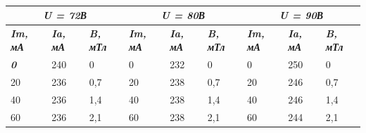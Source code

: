 \documentclass[a4paper,12pt]{article}
\begin{document}
\begin{table}[h]
\begin{center}
\caption{}
\begin{tabular}{|lll|lll|lll|}
\hline
\multicolumn{3}{|c|}{\cellcolor[HTML]{FFFFFF}\textit{\textbf{U   = 72В}}}                                                                         & \multicolumn{3}{c|}{\textit{\textbf{U = 80В}}}                                                                           & \multicolumn{3}{c|}{\textit{\textbf{U = 90В}}}                                                                           \\ \hline
\multicolumn{1}{|l|}{\cellcolor[HTML]{FFFFFF}\textit{\textbf{Im, мА}}} & \multicolumn{1}{l|}{\textit{\textbf{Ia, мА}}} & \textit{\textbf{B, мТл}} & \multicolumn{1}{l|}{\textit{\textbf{Im, мА}}} & \multicolumn{1}{l|}{\textit{\textbf{Ia, мА}}} & \textit{\textbf{B, мТл}} & \multicolumn{1}{l|}{\textit{\textbf{Im, мА}}} & \multicolumn{1}{l|}{\textit{\textbf{Ia, мА}}} & \textit{\textbf{B, мТл}} \\ \hline
\multicolumn{1}{|l|}{\cellcolor[HTML]{FFFFFF}\textit{\textbf{0}}}      & \multicolumn{1}{l|}{240}                      & 0                        & \multicolumn{1}{l|}{0}                        & \multicolumn{1}{l|}{232}                      & 0                        & \multicolumn{1}{l|}{0}                        & \multicolumn{1}{l|}{250}                      & 0                        \\ \hline
\multicolumn{1}{|l|}{20}                                               & \multicolumn{1}{l|}{236}                      & 0,7                      & \multicolumn{1}{l|}{20}                       & \multicolumn{1}{l|}{238}                      & 0,7                      & \multicolumn{1}{l|}{20}                       & \multicolumn{1}{l|}{246}                      & 0,7                      \\ \hline
\multicolumn{1}{|l|}{40}                                               & \multicolumn{1}{l|}{236}                      & 1,4                      & \multicolumn{1}{l|}{40}                       & \multicolumn{1}{l|}{238}                      & 1,4                      & \multicolumn{1}{l|}{40}                       & \multicolumn{1}{l|}{246}                      & 1,4                      \\ \hline
\multicolumn{1}{|l|}{60}                                               & \multicolumn{1}{l|}{236}                      & 2,1                      & \multicolumn{1}{l|}{60}                       & \multicolumn{1}{l|}{238}                      & 2,1                      & \multicolumn{1}{l|}{60}                       & \multicolumn{1}{l|}{244}                      & 2,1                      \\ \hline

\end{tabular}
\end{center}
\end{table}
\end{document}
